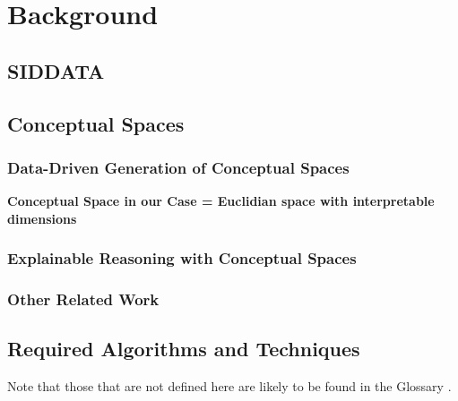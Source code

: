 \chapter{Background}


\section{SIDDATA}


\section{Conceptual Spaces}


\subsection{Data-Driven Generation of Conceptual Spaces}


\textbf{Conceptual Space in our Case = Euclidian space with interpretable dimensions}

\subsection{Explainable Reasoning with Conceptual Spaces}
\label{sec:reasoning}

\subsection{Other Related Work}
\label{sec:otherwork}



\section{Required Algorithms and Techniques}

Note that those that are not defined here are likely to be found in the Glossary .

